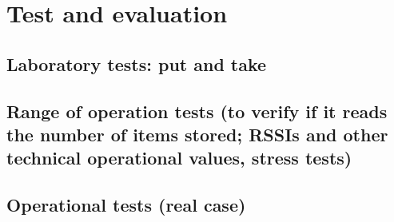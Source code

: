 \chapter{Test and evaluation}

\section{Laboratory tests: put and take}

\section{Range of operation tests (to verify if it reads the number of items stored; RSSIs and other technical operational values, stress tests)}

\section{Operational tests (real case)}